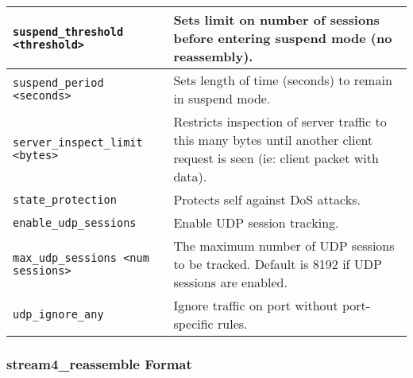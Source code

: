 \documentclass[english]{report}
\begin{document}
\begin{tabular}{| l | p{3.5in} |}
\hline
\texttt{suspend\_threshold <threshold>} & Sets limit on number of sessions before entering suspend mode (no reassembly).\\
\hline
\texttt{suspend\_period <seconds>} & Sets length of time (seconds) to remain in suspend mode.\\
\hline
\texttt{server\_inspect\_limit <bytes>} & Restricts inspection of server traffic to this many bytes until another client request is seen (ie: client packet with data).\\
\hline
\texttt{state\_protection} & Protects self against DoS attacks.\\
\hline
\texttt{enable\_udp\_sessions} & Enable UDP session tracking.\\
\hline
\texttt{max\_udp\_sessions <num sessions>} & The maximum number of UDP sessions to be tracked. Default is 8192 if UDP sessions are enabled.\\
\hline
\texttt{udp\_ignore\_any} & Ignore traffic on port without port-specific rules.\\
\hline
\end{tabular}

\subsubsection{stream4\_reassemble Format}
\end{document}
